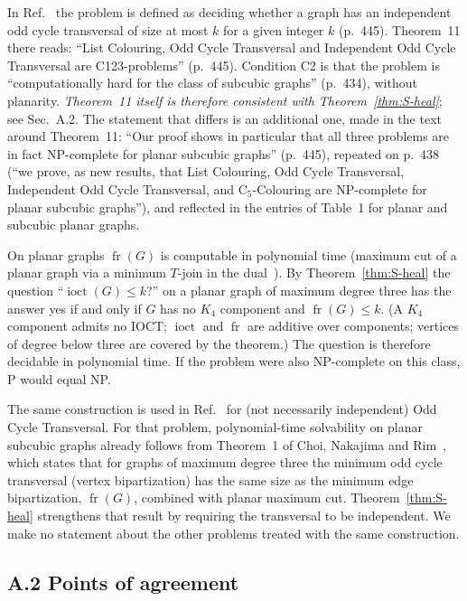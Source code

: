 \documentclass[aps,pre,onecolumn,superscriptaddress,nofootinbib]{revtex4-2}
\theoremstyle{remark}
\newcommand{\fr}{\operatorname{fr}}
\newcommand{\ioct}{\operatorname{ioct}}
\begin{document}
In Ref.~\cite{Johnson2025} the problem is defined as deciding whether a graph has an independent
odd cycle transversal of size at most $k$ for a given integer $k$ (p.~445). Theorem~11 there reads:
``List Colouring, Odd Cycle Transversal and Independent Odd Cycle Transversal are C123-problems''
(p.~445). Condition C2 is that the problem is ``computationally hard for the class of subcubic
graphs'' (p.~434), without planarity. \emph{Theorem~11 itself is therefore consistent with
Theorem~\ref{thm:S-heal}}; see Sec.~A.2. The statement that differs is an additional one, made
in the text around Theorem~11: ``Our proof shows in particular that all three problems are in
fact NP-complete for planar subcubic graphs'' (p.~445), repeated on p.~438 (``we prove, as new
results, that List Colouring, Odd Cycle Transversal, Independent Odd Cycle Transversal, and
C$_5$-Colouring are NP-complete for planar subcubic graphs''), and reflected in the entries of
Table~1 for planar and subcubic planar graphs.

On planar graphs $\fr(G)$ is computable in polynomial time (maximum cut of a planar graph via a
minimum $T$-join in the dual~\cite{Hadlock1975,Barahona1982}). By Theorem~\ref{thm:S-heal} the
question ``$\ioct(G)\le k$?'' on a planar graph of maximum degree three has the answer yes if and
only if $G$ has no $K_4$ component and $\fr(G)\le k$. (A $K_4$ component admits no IOCT; $\ioct$
and $\fr$ are additive over components; vertices of degree below three are covered by the
theorem.) The question is therefore decidable in polynomial time. If the problem were also
NP-complete on this class, P would equal NP.

The same construction is used in Ref.~\cite{Johnson2025} for (not necessarily independent) Odd
Cycle Transversal. For that problem, polynomial-time solvability on planar subcubic graphs already
follows from Theorem~1 of Choi, Nakajima and Rim~\cite{Choi1989}, which states that for graphs of
maximum degree three the minimum odd cycle transversal (vertex bipartization) has the same size as
the minimum edge bipartization, $\fr(G)$, combined with planar maximum cut. Theorem~\ref{thm:S-heal}
strengthens that result by requiring the transversal to be independent. We make no statement
about the other problems treated with the same construction.

\subsection*{A.2 Points of agreement}
\end{document}
